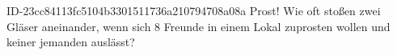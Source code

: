 \begin{exercise}
      {ID-23cc84113fc5104b3301511736a210794708a08a}
      {Prost!}
  \ifproblem\problem
    Wie oft stoßen zwei Gläser aneinander, wenn sich 8 Freunde in einem Lokal
    zuprosten wollen und keiner jemanden auslässt?
  \fi
\end{exercise}

